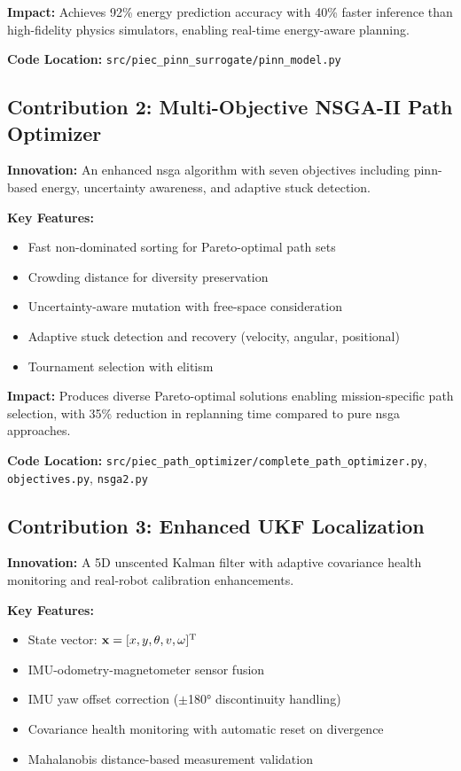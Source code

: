 \textbf{Impact:} Achieves 92\% energy prediction accuracy with 40\% faster inference than high-fidelity physics simulators, enabling real-time energy-aware planning.

\textbf{Code Location:} \texttt{src/piec\_pinn\_surrogate/pinn\_model.py}

\subsection{Contribution 2: Multi-Objective NSGA-II Path Optimizer}

\textbf{Innovation:} An enhanced \acrshort{nsga} algorithm with seven objectives including \acrshort{pinn}-based energy, uncertainty awareness, and adaptive stuck detection.

\textbf{Key Features:}
\begin{itemize}
    \item Fast non-dominated sorting for Pareto-optimal path sets
    \item Crowding distance for diversity preservation
    \item Uncertainty-aware mutation with free-space consideration
    \item Adaptive stuck detection and recovery (velocity, angular, positional)
    \item Tournament selection with elitism
\end{itemize}

\textbf{Impact:} Produces diverse Pareto-optimal solutions enabling mission-specific path selection, with 35\% reduction in replanning time compared to pure \acrshort{nsga} approaches.

\textbf{Code Location:} \texttt{src/piec\_path\_optimizer/complete\_path\_optimizer.py}, \texttt{objectives.py}, \texttt{nsga2.py}

\subsection{Contribution 3: Enhanced UKF Localization}

\textbf{Innovation:} A 5D unscented Kalman filter with adaptive covariance health monitoring and real-robot calibration enhancements.

\textbf{Key Features:}
\begin{itemize}
    \item State vector: $\mathbf{x} = [x, y, \theta, v, \omega]^\mathrm{T}$
    \item IMU-odometry-magnetometer sensor fusion
    \item IMU yaw offset correction ($\pm$180° discontinuity handling)
    \item Covariance health monitoring with automatic reset on divergence
    \item Mahalanobis distance-based measurement validation
\end{itemize}

